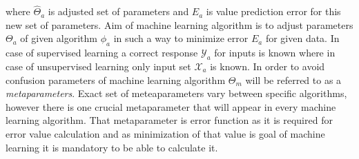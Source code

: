 where $\hat{\Theta}_{a}$ is adjusted set of parameters and $E_{a}$ is value prediction 
error for this new set of parameters.
Aim of machine learning algorithm is to adjust parameters $\Theta_{a}$ of given algorithm 
$\phi_{a}$ in such a way to minimize error $E_{a}$ for given data. In case of supervised learning
a correct response $\mathcal{Y}_{a}$ for inputs is known where in case of unsupervised learning
only input set $\mathcal{X}_{a}$ is known. In order to avoid confusion parameters of machine 
learning algorithm $\Theta_{m}$ will be referred to as a \textit{metaparameters}. 
Exact set of meteaparameters vary between specific algorithms, however there is one 
crucial metaparameter that will appear in every machine learning algorithm.
That metaparameter is error function as it is required for error value calculation and as 
minimization of that value is goal of machine learning it is mandatory to be able to calculate it.
